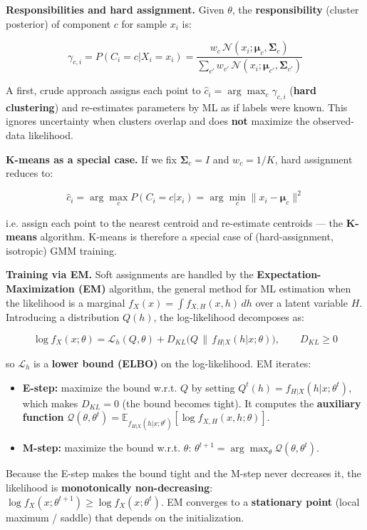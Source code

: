 \textbf{Responsibilities and hard assignment.} Given $\theta$, the \textbf{responsibility} (cluster posterior) of component $c$ for sample $x_i$ is:

$$\gamma_{c,i} = P(C_i=c|X_i=x_i) = \frac{w_c\,\mathcal{N}(x_i;\boldsymbol{\mu}_c,\boldsymbol{\Sigma}_c)}{\sum_{c'} w_{c'}\,\mathcal{N}(x_i;\boldsymbol{\mu}_{c'},\boldsymbol{\Sigma}_{c'})}$$

A first, crude approach assigns each point to $\hat{c}_i = \arg\max_c \gamma_{c,i}$ (\textbf{hard clustering}) and re-estimates parameters by ML as if labels were known. This ignores uncertainty when clusters overlap and does \textbf{not} maximize the observed-data likelihood.

\textbf{K-means as a special case.} If we fix $\boldsymbol{\Sigma}_c = I$ and $w_c = 1/K$, hard assignment reduces to:

$$\hat{c}_i = \arg\max_c P(C_i=c|x_i) = \arg\min_c \|x_i - \boldsymbol{\mu}_c\|^2$$

i.e. assign each point to the nearest centroid and re-estimate centroids — the \textbf{K-means} algorithm. K-means is therefore a special case of (hard-assignment, isotropic) GMM training.

\textbf{Training via EM.} Soft assignments are handled by the \textbf{Expectation-Maximization (EM)} algorithm, the general method for ML estimation when the likelihood is a marginal $f_X(x)=\int f_{X,H}(x,h)\,dh$ over a latent variable $H$. Introducing a distribution $Q(h)$, the log-likelihood decomposes as:

$$\log f_X(x;\theta) = \mathcal{L}_h(Q,\theta) + D_{KL}\big(Q\,\|\,f_{H|X}(h|x;\theta)\big), \qquad D_{KL} \ge 0$$

so $\mathcal{L}_h$ is a \textbf{lower bound (ELBO)} on the log-likelihood. EM iterates:

\begin{itemize}
\item \textbf{E-step:} maximize the bound w.r.t. $Q$ by setting $Q^t(h)=f_{H|X}(h|x;\theta^t)$, which makes $D_{KL}=0$ (the bound becomes tight). It computes the \textbf{auxiliary function} $\mathcal{Q}(\theta,\theta^t)=\mathbb{E}_{f_{H|X}(h|x;\theta^t)}[\log f_{X,H}(x,h;\theta)]$.
\item \textbf{M-step:} maximize the bound w.r.t. $\theta$: $\theta^{t+1}=\arg\max_\theta \mathcal{Q}(\theta,\theta^t)$.
\end{itemize}

Because the E-step makes the bound tight and the M-step never decreases it, the likelihood is \textbf{monotonically non-decreasing}: $\log f_X(x;\theta^{t+1}) \ge \log f_X(x;\theta^t)$. EM converges to a \textbf{stationary point} (local maximum / saddle) that depends on the initialization.

